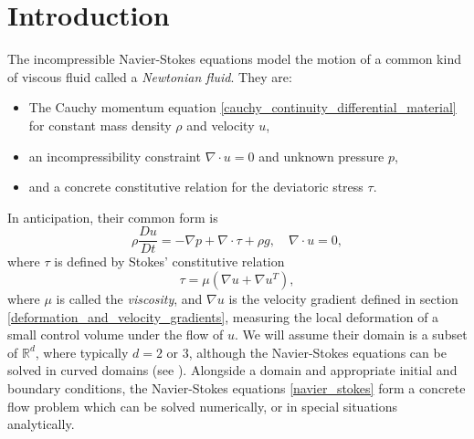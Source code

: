 

\section{Introduction}
The incompressible Navier-Stokes equations model the motion of a common kind of viscous fluid called a \textit{Newtonian fluid}.
They are:
\begin{itemize}
\item The Cauchy momentum equation \eqref{cauchy_continuity_differential_material} for constant mass density $\rho$ and velocity $u$,
\item an incompressibility constraint $\nabla\cdot u = 0$ and unknown pressure $p$,
\item and a concrete constitutive relation for the deviatoric stress $\tau$.
\end{itemize}
In anticipation, their common form is
\begin{equation}\label{navier_stokes}
    \rho\frac{Du}{Dt} = - \nabla p + \nabla\cdot\tau + \rho g,\quad \nabla\cdot u = 0,
\end{equation}
where $\tau$ is defined by Stokes' constitutive relation
\begin{equation}\label{stokes_constitutive_relation}
    \tau = \mu\left(\nabla u + \nabla u^T\right),
\end{equation}
where $\mu$ is called the \textit{viscosity}, and $\nabla u$ is the velocity gradient defined in section \ref{deformation_and_velocity_gradients},
measuring the local deformation of a small control volume under
the flow of $u$. We will assume their domain is a subset of $\mathbb{R}^d$, where typically $d = 2$ or $3$, although the Navier-Stokes equations can be solved
in curved domains (see \cite{stam}).
Alongside a domain and appropriate initial and boundary conditions, the Navier-Stokes equations \eqref{navier_stokes}
form a concrete flow problem which
can be solved numerically, or in special situations analytically.

